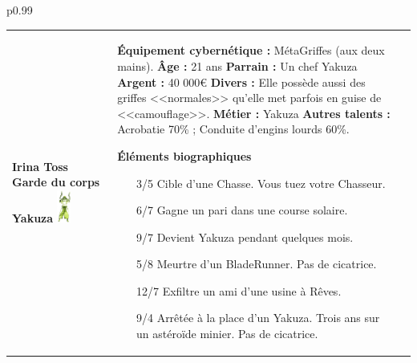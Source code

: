 \documentclass[11pt,twoside,a4paper]{article}
\begin{document}
\begin{longtable}[ht]{ p{} }
		\hline
	\begin{tabular}[h]{ p{} p{} p{} }
		\textbf{Irina Toss	}										\newline
		\textbf{\small Garde du corps Yakuza}						\newline
			\newline
		\includegraphics[width=0.15\textwidth]{img/personnageIrinaToss.jpg}		
			\newline
			
		& %
			
		\textbf{{\'E}quipement cybern{\'e}tique : }M{\'e}taGriffes (aux deux mains). \newline
		\textbf{{\^A}ge : } 21 ans 											\newline
		\textbf{Parrain : } Un chef Yakuza									\newline
		\textbf{Argent : } 40 000\euro 										\newline
		\textbf{Divers : } Elle poss{\`e}de aussi des griffes <<normales>> qu'elle met parfois en guise de <<camouflage>>. \newline
		\textbf{M{\'e}tier : } Yakuza 										\newline
		\textbf{Autres talents : } Acrobatie 70\% ; Conduite d'engins lourds 60\%. \newline
		
		\textbf{{\'E}l{\'e}ments biographiques}
		\begin{itemize}
			\item[3/5] Cible d'une Chasse. Vous tuez votre Chasseur. 
			\item[6/7] Gagne un pari dans une course solaire. 
			\item[9/7] Devient Yakuza pendant quelques mois. 
			\item[5/8] Meurtre d'un BladeRunner. Pas de cicatrice. 
			\item[12/7] Exfiltre un ami d'une usine {\`a} R{\^e}ves. 
			\item[9/4] Arr{\^e}t{\'e}e {\`a} la place d'un Yakuza. Trois ans sur un ast{\'e}ro{\"i}de minier. Pas de cicatrice. 
		\end{itemize}
		

\end{tabular}
\end{longtable}
\end{document}
